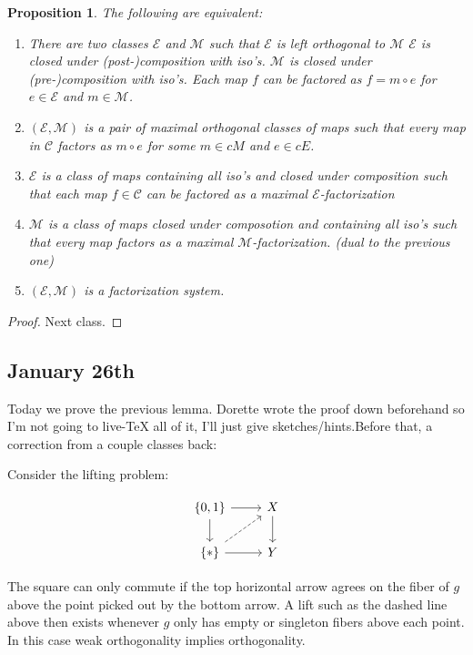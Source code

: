 \documentclass[11pt]{amsart}
\theoremstyle{plain}
\newtheorem{prop}[thm]{Proposition}
\theoremstyle{definition}
\newcommand{\cC}{{\mathcal C}}
\newcommand{\cE}{{\mathcal E}}
\newcommand{\cM}{{\mathcal M}}
\newcommand{\noi}{{\noindent}}
\begin{document}
\begin{prop}
The following are equivalent: 

\begin{enumerate}
\item There are two classes $\cE$ and $\cM$ such that 
  \subitem $\cE$ is left orthogonal to $\cM$ 
  \subitem $\cE$ is closed under (post-)composition with iso's. 
  \subitem $\cM$ is closed under (pre-)composition with iso's. 
  \subitem Each map $f$ can be factored as $f = m \circ e$ for $e \in \cE$ and $m \in \cM$.

\item $(\cE, \cM)$ is a pair of maximal orthogonal classes of maps such that every map in $\cC$ factors as $m \circ e$ for some $m \in cM$ and $e \in cE$. 
\item $\cE$ is a class of maps containing all iso's and closed under composition such that each map $f \in \cC$ can be factored as a maximal $\cE$-factorization 
\item $\cM$ is a class of maps closed under composotion and containing all iso's such that every map factors as a maximal $\cM$-factorization. (dual to the previous one)
\item $(\cE, \cM)$ is a factorization system. 
\end{enumerate}
\end{prop}
\begin{proof}
Next class. 
\end{proof}

\subsection{January 26th}

Today we prove the previous lemma. Dorette wrote the proof down beforehand so I'm not going to live-TeX all of it, I'll just give sketches/hints.Before that, a correction from a couple classes back:

Consider the lifting problem: 

\[ \begin{tikzcd}
  \{0,1\} \dar[] \rar[] & X \dar[] \\
\{*\} \rar[] \ar[ur, dashed] & Y \end{tikzcd}\]

\noi The square can only commute if the top horizontal arrow agrees on the fiber of $g$ above the point picked out by the bottom arrow. A lift such as the dashed line above then exists whenever $g$ only has empty or singleton fibers above each point. In this case weak orthogonality implies orthogonality. 
\end{document}
